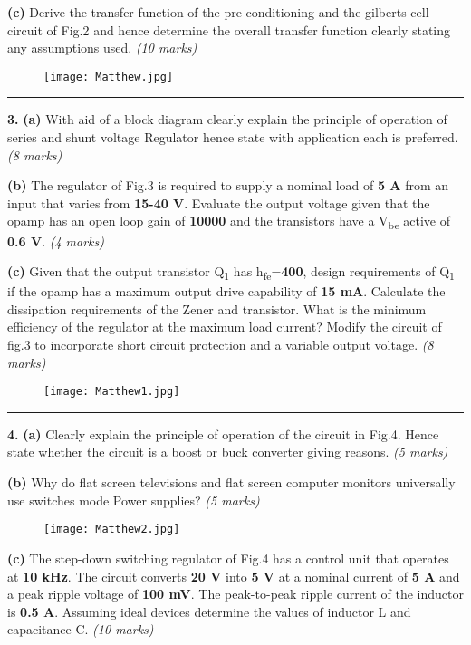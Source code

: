 \textbf{(c)} Derive the transfer function of the pre-conditioning and the gilberts cell circuit of Fig.2 and hence determine the overall transfer function clearly stating any assumptions used.
\textit{(10 marks)}
\begin{figure}[h!]
    \centering
    \texttt{[image: Matthew.jpg]}
\end{figure}
\begin{center}\rule{0.5\linewidth}{0.5pt}\end{center}

\textbf{3.} \textbf{(a)} With aid of a block diagram clearly explain the principle of operation of series and shunt voltage Regulator hence state with application each is preferred.
\textit{(8 marks)}

\textbf{(b)} The regulator of Fig.3 is required to supply a nominal load of \textbf{5 A} from an input that varies from \textbf{15-40 V}. Evaluate the output voltage given that the opamp has an open loop gain of \textbf{10000} and the transistors have a V\textsubscript{be} active of \textbf{0.6 V}.
\textit{(4 marks)}

\textbf{(c)} Given that the output transistor Q\textsubscript{1} has h\textsubscript{fe}=\textbf{400}, design requirements of Q\textsubscript{1} if the opamp has a maximum output drive capability of \textbf{15 mA}. Calculate the dissipation requirements of the Zener and transistor. What is the minimum efficiency of the regulator at the maximum load current? Modify the circuit of fig.3 to incorporate short circuit protection and a variable output voltage.
\textit{(8 marks)}
\begin{figure}[h!]
    \centering
    \texttt{[image: Matthew1.jpg]}
\end{figure}
\begin{center}\rule{0.5\linewidth}{0.5pt}\end{center}

\textbf{4.} \textbf{(a)} Clearly explain the principle of operation of the circuit in Fig.4. Hence state whether the circuit is a boost or buck converter giving reasons.
\textit{(5 marks)}

\textbf{(b)} Why do flat screen televisions and flat screen computer monitors universally use switches mode Power supplies?
\textit{(5 marks)}
\begin{figure}[h!]
    \centering
    \texttt{[image: Matthew2.jpg]}
\end{figure}
\textbf{(c)} The step-down switching regulator of Fig.4 has a control unit that operates at \textbf{10 kHz}. The circuit converts \textbf{20 V} into \textbf{5 V} at a nominal current of \textbf{5 A} and a peak ripple voltage of \textbf{100 mV}. The peak-to-peak ripple current of the inductor is \textbf{0.5 A}. Assuming ideal devices determine the values of inductor L and capacitance C.
\textit{(10 marks)}